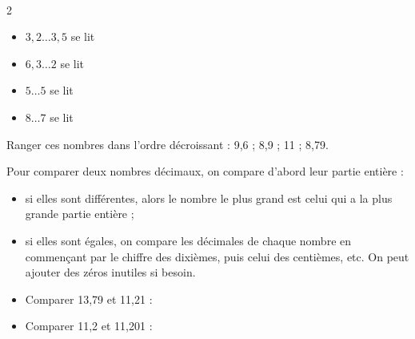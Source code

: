 \begin{Exemples}
$ $
\vspace{-1cm}
\begin{multicols}{2}
\begin{itemize}
\item $3,2 \ldots 3,5$ se lit \ligne

\item $6,3 \ldots 2$ se lit \ligne


\item $5\ldots 5$ se lit \ligne


\item $8\ldots 7$ se lit \ligne


\end{itemize}
\end{multicols}
\vspace{-0.5cm}
\end{Exemples}


\begin{Exemple}
Ranger ces nombres dans l'ordre décroissant : 9,6 ; 8,9 ; 11 ; 8,79. 

\ligne

\end{Exemple}

\newpage


\begin{Méthode}
Pour comparer deux nombres décimaux, on compare d'abord leur partie entière :
\begin{itemize}[label=\textcolor{Couleur7}{$\bullet$}]
\item si elles sont différentes, alors le nombre le plus grand est celui qui a la plus grande partie entière ;
\item si elles sont égales, on compare les décimales de chaque nombre en commençant par le chiffre des dixièmes, puis celui des centièmes, etc. On peut ajouter des zéros inutiles si besoin.
\end{itemize}
\end{Méthode}



\begin{Exemples}
\begin{itemize}
\item Comparer 13,79 et 11,21 : \ligne

\item Comparer 11,2 et 11,201 : \ligne

\ligne

\ligne



\end{itemize}
\end{Exemples}

